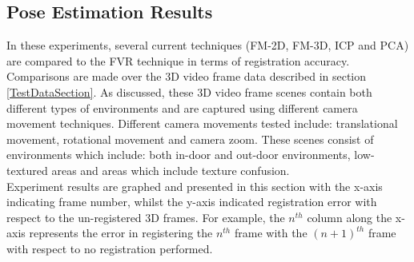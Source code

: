 \subsection{Pose Estimation Results}

In these experiments, several current techniques (FM-2D, FM-3D, ICP and PCA) are compared to the FVR technique in terms of registration accuracy. Comparisons are made over  the 3D video frame data described in section \ref{TestDataSection}. As discussed, these 3D video frame scenes contain both different types of environments and are captured using different camera movement techniques. Different camera movements tested include: translational movement, rotational movement and camera zoom. These scenes consist of environments which include: both in-door and out-door environments, low-textured areas and areas which include texture confusion. \\

Experiment results are graphed and presented in this section with the x-axis indicating frame number, whilst the y-axis indicated registration error with respect to the un-registered 3D frames. For example, the $n^{th}$ column along the x-axis represents the error in registering the $n^{th}$ frame with the $(n+1)^{th}$ frame with respect to no registration performed. \\ 




